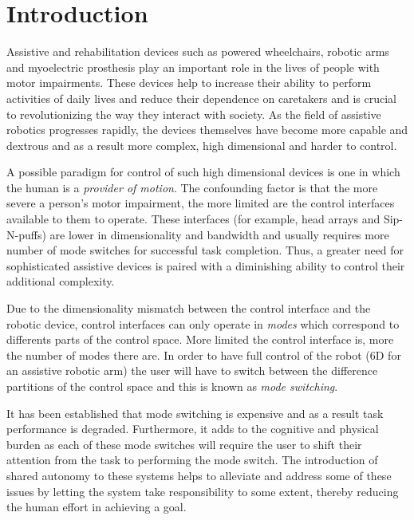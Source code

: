 \documentclass[conference]{IEEEtran}
\begin{document}
\IEEEpeerreviewmaketitle

\section{Introduction}

Assistive and rehabilitation devices such as powered wheelchairs, robotic arms and myoelectric prosthesis play an important role in the lives of people with motor impairments. These devices help to increase their ability to perform activities of daily lives and reduce their dependence on caretakers and is crucial to revolutionizing the way they interact with society. As the field of assistive robotics progresses rapidly, the devices themselves have become more capable and dextrous and as a result more complex, high dimensional and harder to control. 

A possible paradigm for control of such high dimensional devices is one in which the human is a \textit{provider of motion}. The confounding factor is that the more severe a person's motor impairment, the more limited are the control interfaces available to them to operate. These interfaces (for example, head arrays and Sip-N-puffs) are lower in dimensionality and bandwidth and usually requires more number of mode switches for successful task completion. Thus, a greater need for sophisticated assistive devices is paired with a diminishing ability to control their additional complexity. 

Due to the dimensionality mismatch between the control interface and the robotic device, control interfaces can only operate in \textit{modes} which correspond to differents parts of the control space. More limited the control interface is, more the number of modes there are. In order to have full control of the robot (6D for an assistive robotic arm) the user will have to switch between the difference partitions of the control space and this is known as \textit{mode switching}. 

It has been established that mode switching is expensive and as a result task performance is degraded. Furthermore, it adds to the cognitive and physical burden as each of these mode switches will require the user to shift their attention from the task to performing the mode switch. The introduction of shared autonomy to these systems helps to alleviate and address some of these issues by letting the system take responsibility to some extent, thereby reducing the human effort in achieving a goal. 
\end{document}
